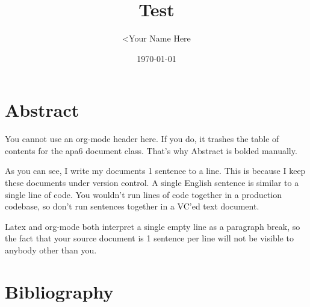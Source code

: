 \documentclass[11pt]{article}
\author{<Your Name Here}
\date{\today}
\title{Test}
\begin{document}
\maketitle
\tableofcontents



\section{Abstract}
\label{sec:org65ab663}

You cannot use an org-mode header here.
If you do, it trashes the table of contents for the apa6 document class.
That's why Abstract is bolded manually.

As you can see, I write my documents 1 sentence to a line.
This is because I keep these documents under version control.
A single English sentence is similar to a single line of code.
You wouldn't run lines of code together in a production codebase, so don't run sentences together in a VC'ed text document.

Latex and org-mode both interpret a single empty line as a paragraph break, so the fact that your source document is 1 sentence per line will not be visible to anybody other than you.

\cite{devlin2019}
\section{Bibliography}
\label{sec:org531805b}


\printbibliography
\end{document}

